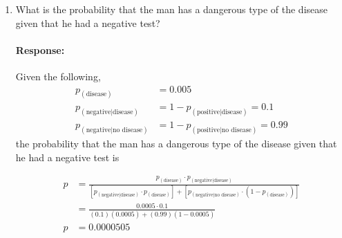 \documentclass [11pt] {article}
\newenvironment{response}{\begin{responseframe}\vspace{-10pt}\paragraph{Response:}}{\end{responseframe}}
\begin{document}
\begin{enumerate}
\begin{enumerate}
\begin{enumerate}[itemsep=10pt]
\begin{response}
                            \begin{align*}
                                p &= \frac{p_{(\text{disease})} \cdot p_{(\text{positive} | \text{disease})}}
                                {\left[ p_{(\text{positive} | \text{disease})} \cdot p_{(\text{disease})} \right] + 
                                    \left[ p_{(\text{positive} | \text{no disease})} \cdot 
                                \left( 1 - p_{(\text{disease})} \right) \right]} \\
                                  &= \frac{0.0005 \cdot 0.9}{(0.9)(0.0005) + (0.01)(1 - 0.0005)} \\
                                p &= 0.0431
                            \end{align*}
                        \end{response}

                    \item What is the probability that the man has a dangerous type of the disease
                        given that he had a negative test?
                        \begin{response}
                            Given the following,
                            \begin{align*}
                                p_{(\text{disease})} &= 0.005 \\
                                p_{(\text{negative} | \text{disease})} &= 1 - p_{(\text{positive} | \text{disease})} = 0.1 \\
                                p_{(\text{negative} | \text{no disease})} &= 1 - p_{(\text{positive} | \text{no disease})} = 0.99
                            \end{align*}
                            the probability that the man has a dangerous type of the disease given 
                            that he had a negative test is

                            \begin{align*}
                                p &= \frac{p_{(\text{disease})} \cdot p_{(\text{negative} | \text{disease})}}
                                {\left[ p_{(\text{negative} | \text{disease})} \cdot p_{(\text{disease})} \right] + 
                                    \left[ p_{(\text{negative} | \text{no disease})} \cdot 
                                \left( 1 - p_{(\text{disease})} \right) \right]} \\
                                  &= \frac{0.0005 \cdot 0.1}{(0.1)(0.0005) + (0.99)(1 - 0.0005)} \\
                                p &= 0.0000505
                            \end{align*}
                        \end{response}
                \end{enumerate}


\end{enumerate}
\end{enumerate}
\end{document}
